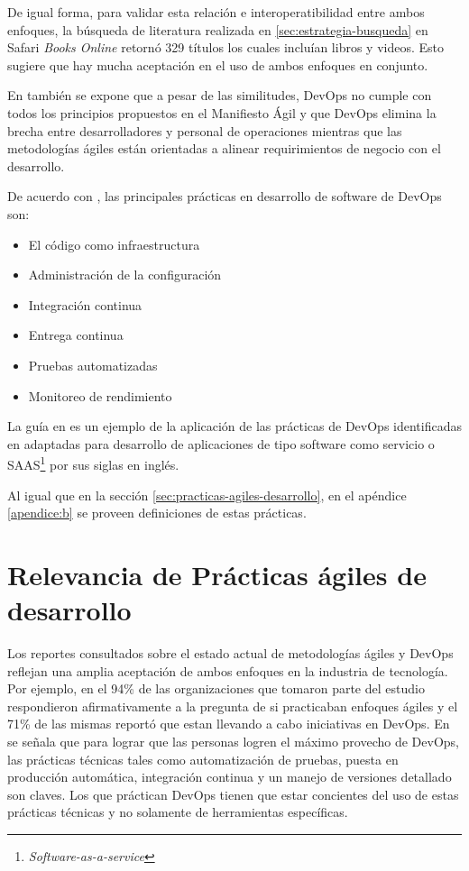 \documentclass[journal]{IEEEtran}
\begin{document}
De igual forma, para validar esta relación e interoperatibilidad entre ambos enfoques, la búsqueda de literatura realizada en \ref{sec:estrategia-busqueda} en Safari \emph{Books Online} retornó   329 títulos los cuales incluían libros y videos. Esto sugiere que hay mucha aceptación en el uso de ambos enfoques en conjunto.

En \cite{jabbari-et-al} también se expone que a pesar de las similitudes, DevOps no cumple con todos los principios propuestos en el Manifiesto Ágil \cite{agile-manifesto} y que DevOps elimina la brecha entre desarrolladores y personal de operaciones mientras que las metodologías ágiles están orientadas a alinear requirimientos de negocio con el desarrollo.

De acuerdo con \cite{jabbari-et-al}, las principales prácticas en desarrollo de software de DevOps son:
\begin{itemize}
    \item El código como infraestructura
    \item Administración de la configuración
    \item Integración continua
    \item Entrega continua
    \item Pruebas automatizadas
    \item Monitoreo de rendimiento
\end{itemize}
La guía en \cite{wiggins} es un ejemplo de la aplicación de las prácticas de DevOps identificadas en \cite{jabbari-et-al} adaptadas para desarrollo de aplicaciones de tipo software como servicio o SAAS\footnote{\emph{Software-as-a-service}} por sus siglas en inglés.

Al igual que en la sección \ref{sec:practicas-agiles-desarrollo}, en el apéndice \ref{apendice:b} se proveen definiciones de estas prácticas.

\section{Relevancia de Prácticas ágiles de desarrollo} \label{sec:relevancia-agile}
Los reportes consultados sobre el estado actual de metodologías ágiles\cite{version-one} y DevOps\cite{puppet-devops} reflejan una amplia aceptación de ambos enfoques en la industria de tecnología. Por ejemplo, en \cite{version-one} el 94\% de las organizaciones que tomaron parte del estudio respondieron afirmativamente a la pregunta de si practicaban enfoques ágiles y el 71\% de las mismas reportó que estan llevando a cabo iniciativas en DevOps. En \cite{puppet-devops} se señala que para lograr que las personas logren el máximo provecho de DevOps, las prácticas técnicas tales como automatización de pruebas, puesta en producción automática, integración continua y un manejo de versiones detallado son claves. Los que práctican DevOps tienen que estar concientes del uso de estas prácticas técnicas y no solamente de herramientas específicas. 
\end{document}
